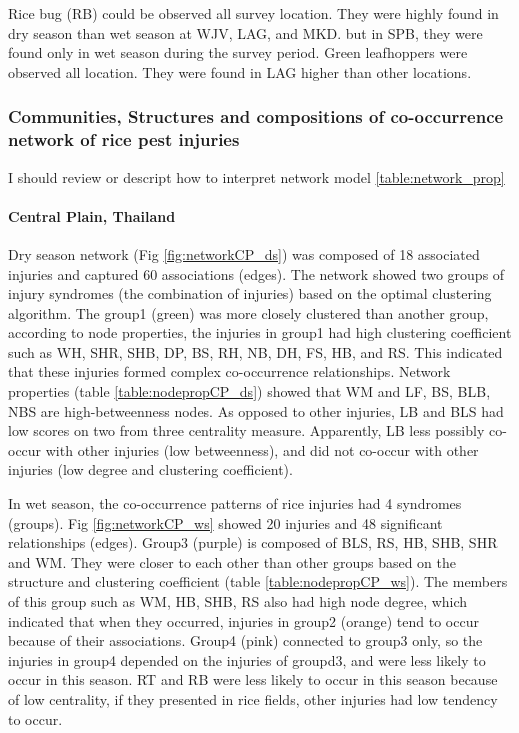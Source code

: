 Rice bug (RB) could be observed all survey location. They were highly found in dry season than wet season at WJV, LAG, and MKD. but in SPB, they were found only in wet season during the survey period.  Green leafhoppers were observed all location. They were found in LAG higher than other locations.

\subsubsection{Communities, Structures and compositions of co-occurrence network of rice pest injuries}
I should review or descript how to interpret network model 
\ref{table:network_prop}
\paragraph{Central Plain, Thailand}

Dry season network (Fig \ref{fig:networkCP_ds}) was composed of 18 associated injuries and captured 60 associations (edges). The network showed two groups of injury syndromes (the combination of injuries) based on the optimal clustering algorithm. The group1 (green) was more closely clustered than another group, according to node properties, the injuries in group1 had high clustering coefficient such as WH, SHR, SHB, DP, BS, RH, NB, DH, FS, HB, and RS. This indicated that these injuries formed complex co-occurrence relationships. Network properties (table \ref{table:nodepropCP_ds}) showed that WM and LF, BS, BLB, NBS are high-betweenness nodes.  As opposed to other injuries, LB and BLS had low scores on two from three centrality measure. Apparently, LB less possibly co-occur with other injuries (low betweenness), and did not co-occur with other injuries (low degree and clustering coefficient).

In wet season, the co-occurrence patterns of rice injuries had 4 syndromes (groups).  Fig \ref{fig:networkCP_ws} showed 20 injuries and 48  significant relationships (edges). Group3 (purple) is composed of BLS, RS, HB, SHB, SHR and WM. They were closer to each other than other groups based on the structure and clustering coefficient (table \ref{table:nodepropCP_ws}). The members of this group such as WM, HB, SHB, RS also had high node degree, which indicated that when they occurred, injuries in group2 (orange) tend to occur because of their associations. Group4 (pink) connected to group3 only, so the injuries in group4 depended on the injuries of groupd3, and were less likely to occur in this season.  RT and RB were less likely to occur in this season because of low centrality, if they presented in rice fields, other injuries had low tendency to occur. 

